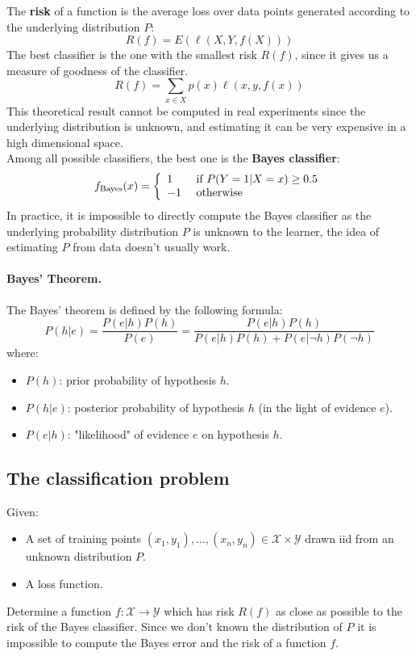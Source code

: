 The \textbf{risk} of a function is the average loss over data points generated according to the underlying distribution $P$:
$$R ( f ) = E ( \ell ( X , Y , f ( X ) ) )$$
The best classifier is the one with the smallest risk $R(f)$, since it gives us a measure of goodness of the classifier.
$$R(f) = \sum_{x \in X}p(x)\ell(x,y,f(x))$$
This theoretical result cannot be computed in real experiments since the underlying distribution is unknown, and estimating it can be very expensive in a high dimensional space.\\
Among all possible classifiers, the best one is the \textbf{Bayes classifier}:
$$
f _ { \text {Bayes} } ( x ) = \left\{ \begin{array} { l l } { 1 } & { \text { if } P ( Y = 1 | X = x ) \geq 0.5 } \\ { - 1 } & { \text { otherwise } } \end{array} \right.
$$
In practice, it is impossible to directly compute the Bayes classifier as the underlying probability distribution $P$ is unknown to the learner, the idea of estimating $P$ from data doesn't usually work.

\paragraph{Bayes' Theorem.} The Bayes' theorem is defined by the following formula:
$$
P ( h | e ) = \frac { P ( e | h ) P ( h ) } { P ( e ) } = \frac { P ( e | h ) P ( h ) } { P ( e | h ) P ( h ) + P ( e | \neg h ) P ( \neg h ) }
$$
where:
\begin{itemize}
	\item $P(h)$: prior probability of hypothesis $h$.
	\item $P(h|e)$: posterior probability of hypothesis $h$ (in the light of evidence $e$).
	\item $P(e|h)$: "likelihood" of evidence $e$ on hypothesis $h$.
\end{itemize}

\subsection{The classification problem} 
Given:
\begin{itemize}
	\item A set of training points $(x_1,y_1), \dots, (x_n, y_n) \in \mathcal{X} \times \mathcal{Y}$ drawn iid from an unknown distribution $P$.
	\item A loss function.
\end{itemize}
Determine a function $f:\mathcal{X} \rightarrow \mathcal{Y}$ which has risk $R(f)$ as close as possible to the risk of the Bayes classifier. Since we don't known the distribution of $P$ it is impossible to compute the Bayes error and the risk of a function $f$.

